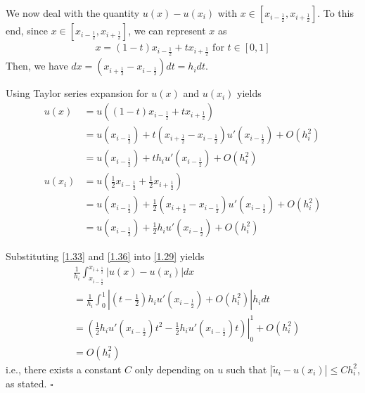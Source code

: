 \documentclass[a4paper]{article}
\numberwithin{equation}{section}
\begin{document}
We now deal with the quantity ${u\left( x \right) - u\left( {{x_i}} \right)}$ with $x \in \left[ {{x_{i - \frac{1}{2}}},{x_{i + \frac{1}{2}}}} \right]$. To this end, since $x \in \left[ {{x_{i - \frac{1}{2}}},{x_{i + \frac{1}{2}}}} \right]$, we can represent $x$ as
\begin{align}
x = \left( {1 - t} \right){x_{i - \frac{1}{2}}} + t{x_{i + \frac{1}{2}}}\mbox{ for } t \in \left[ {0,1} \right]
\end{align}
Then, we have $dx = \left( {{x_{i + \frac{1}{2}}} - {x_{i - \frac{1}{2}}}} \right)dt = {h_i}dt$.

Using Taylor series expansion for $u\left( x \right)$ and $u\left( {{x_i}} \right)$ yields
\begin{align}
u\left( x \right) &= u\left( {\left( {1 - t} \right){x_{i - \frac{1}{2}}} + t{x_{i + \frac{1}{2}}}} \right)\\
 &= u\left( {{x_{i - \frac{1}{2}}}} \right) + t\left( {{x_{i + \frac{1}{2}}} - {x_{i - \frac{1}{2}}}} \right)u'\left( {{x_{i - \frac{1}{2}}}} \right) + O\left( {h_i^2} \right)\\
& = u\left( {{x_{i - \frac{1}{2}}}} \right) + t{h_i}u'\left( {{x_{i - \frac{1}{2}}}} \right) + O\left( {h_i^2} \right)\label{1.33}\\
u\left( {{x_i}} \right) &= u\left( {\frac{1}{2}{x_{i - \frac{1}{2}}} + \frac{1}{2}{x_{i + \frac{1}{2}}}} \right)\\
 &= u\left( {{x_{i - \frac{1}{2}}}} \right) + \frac{1}{2}\left( {{x_{i + \frac{1}{2}}} - {x_{i - \frac{1}{2}}}} \right)u'\left( {{x_{i - \frac{1}{2}}}} \right) + O\left( {h_i^2} \right)\\
 &= u\left( {{x_{i - \frac{1}{2}}}} \right) + \frac{1}{2}{h_i}u'\left( {{x_{i - \frac{1}{2}}}} \right) + O\left( {h_i^2} \right) \label{1.36}
\end{align}

Substituting \eqref{1.33} and \eqref{1.36} into \eqref{1.29} yields
\begin{align}
&\frac{1}{{{h_i}}}\int_{{x_{i - \frac{1}{2}}}}^{{x_{i + \frac{1}{2}}}} {\left| {u\left( x \right) - u\left( {{x_i}} \right)} \right|dx}  \\
&= \frac{1}{{{h_i}}}\int_0^1 {\left| {\left( {t - \frac{1}{2}} \right){h_i}u'\left( {{x_{i - \frac{1}{2}}}} \right) + O\left( {h_i^2} \right)} \right|{h_i}dt} \\
 &= \left. {\left( {\frac{1}{2}{h_i}u'\left( {{x_{i - \frac{1}{2}}}} \right){t^2} - \frac{1}{2}{h_i}u'\left( {{x_{i - \frac{1}{2}}}} \right)t} \right)} \right|_0^1 + O\left( {h_i^2} \right)\\
 &= O\left( {h_i^2} \right)
\end{align}
i.e., there exists a constant $C$ only depending on $u$ such that $\left| {{{\widetilde u}_i} - u\left( {{x_i}} \right)} \right| \le Ch_i^2$, as stated. \hfill $\square$\\
\end{document}
